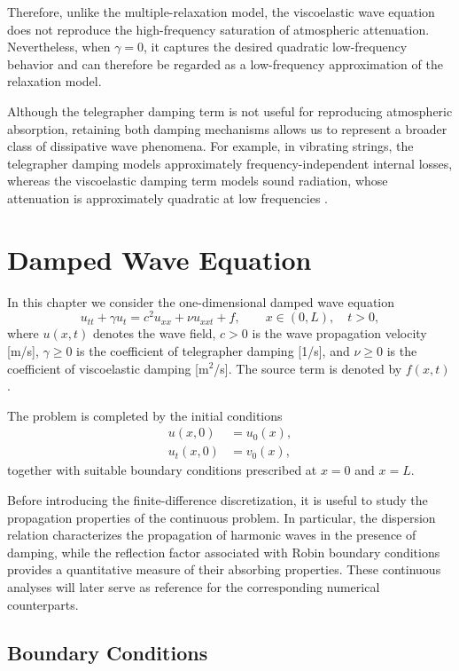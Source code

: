 \documentclass{Configuration_Files/PoliMi3i_thesis}
\begin{document}
Therefore, unlike the multiple-relaxation model, the viscoelastic wave equation does not reproduce the high-frequency saturation of atmospheric attenuation. Nevertheless, when $\gamma=0$, it captures the desired quadratic low-frequency behavior and can therefore be regarded as a low-frequency approximation of the relaxation model.

Although the telegrapher damping term is not useful for reproducing atmospheric absorption, retaining both damping mechanisms allows us to represent a broader class of dissipative wave phenomena. For example, in vibrating strings, the telegrapher damping models approximately frequency-independent internal losses, whereas the viscoelastic damping term models sound radiation, whose attenuation is approximately quadratic at low frequencies \citep[Chapter~4, \S4.2]{ruiz_technique_1969}.

\section{Damped Wave Equation}

In this chapter we consider the one-dimensional damped wave equation
\begin{equation} \label{eq:wave}
u_{tt}
+\gamma u_t
=
c^2u_{xx}
+\nu u_{xxt}
+
f,
\qquad
x\in(0,L),\quad t>0,
\end{equation}
where \(u(x,t)\) denotes the wave field, \(c>0\) is the wave propagation velocity [m/s], \(\gamma\ge0\) is the coefficient of telegrapher damping [1/s], and \(\nu\ge0\) is the coefficient of viscoelastic damping [m$^2$/s]. The source term is
denoted by \(f(x,t)\).

The problem is completed by the initial conditions
\begin{align*}
u(x,0)&=u_0(x),\\
u_t(x,0)&=v_0(x),
\end{align*}
together with suitable boundary conditions prescribed at \(x=0\) and \(x=L\).

Before introducing the finite-difference discretization, it is useful to study the propagation properties of the continuous problem. In particular, the dispersion relation characterizes the propagation of harmonic waves in the presence of damping, while the reflection factor associated with Robin boundary conditions provides a quantitative measure of their absorbing properties. These continuous analyses will later serve as reference for the corresponding numerical counterparts.

\subsection{Boundary Conditions}
\end{document}
